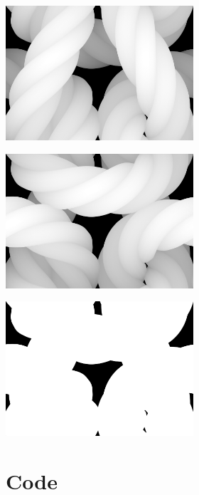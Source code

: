 \documentclass{article}
\begin{document}
\begin{center}
   \includegraphics[width=2.75in]{images/yarn-displacement-front.png}

   \includegraphics[width=2.75in]{images/yarn-displacement-back.png}

   \includegraphics[width=2.75in]{images/yarn-alpha.png}
\end{center}


\clearpage
\pagestyle{empty}

\section{Code}

\label{app:Code}

\inputminted[bgcolor=bg]{c}{../code/plain-knit.c}

\clearpage
\end{document}
